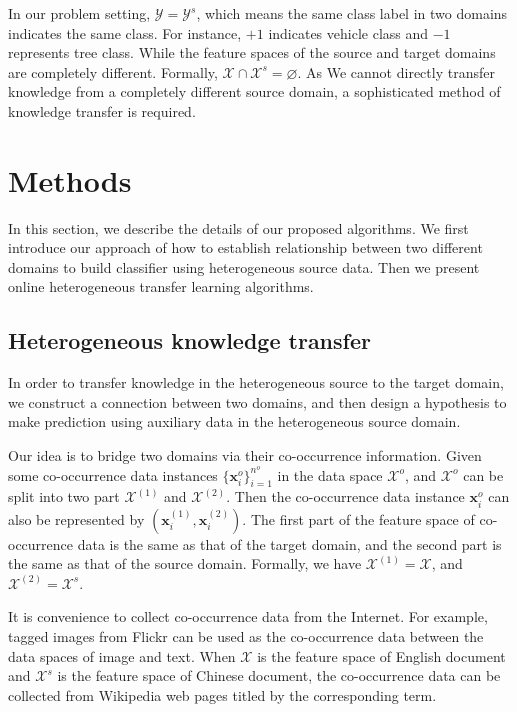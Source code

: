 \documentclass{article} %
\theoremstyle{remark}
\theoremstyle{definition}
\begin{document}
In our problem setting, $\mathcal{Y} = \mathcal{Y}^{s}$, which means the same class label in two domains indicates the same class.
For instance, $+1$ indicates vehicle class and $-1$ represents tree class.
While the feature spaces of the source and target domains are completely different.
Formally, $\mathcal{X} \cap \mathcal{X}^{s} = \varnothing$.
As We cannot directly transfer knowledge from a completely different source domain, a sophisticated method of knowledge transfer is required.

\section{Methods}
In this section, we describe the details of our proposed algorithms.
We first introduce our approach of how to establish relationship between two different domains to build classifier using heterogeneous source data.
Then we present online heterogeneous transfer learning algorithms.

\subsection{Heterogeneous knowledge transfer}
In order to transfer knowledge in the heterogeneous source to the target domain, we construct a connection between two domains, and then design a hypothesis to make prediction using auxiliary data in the heterogeneous source domain.

Our idea is to bridge two domains via their co-occurrence information.
Given some co-occurrence data instances $\{ \mathbf{x}_{i}^{o} \}_{i=1}^{n^o}$ in the data space $\mathcal{X}^o$, and $\mathcal{X}^o$ can be split into two part $\mathcal{X}^{(1)}$ and $\mathcal{X}^{(2)}$.
Then the co-occurrence data instance $\mathbf{x}_{i}^{o}$ can also be represented by $(\mathbf{x}_{i}^{(1)}, \mathbf{x}_{i}^{(2)})$.
The first part of the feature space of co-occurrence data is the same as that of the target domain, and the second part is the same as that of the source domain.
Formally, we have $\mathcal{X}^{(1)} = \mathcal{X}$, and $\mathcal{X}^{(2)} = \mathcal{X}^s$.

It is convenience to collect co-occurrence data from the Internet.
For example, tagged images from Flickr can be used as the co-occurrence data between the data spaces of image and text.
When $\mathcal{X}$ is the feature space of English document and $\mathcal{X}^s$ is the feature space of Chinese document, the co-occurrence data can be collected from Wikipedia web pages titled by the corresponding term.
\end{document}
